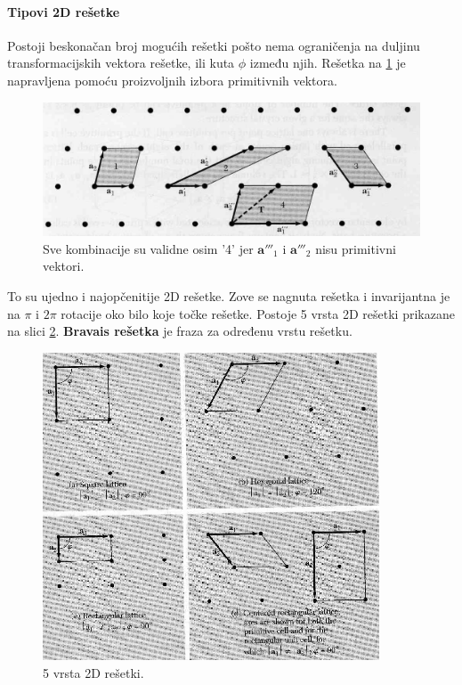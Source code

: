 \documentclass{article}
\numberwithin{equation}{section}
\begin{document}
\paragraph{Tipovi 2D rešetke}
Postoji beskonačan broj mogućih rešetki pošto nema ograničenja na duljinu transformacijskih vektora rešetke, ili kuta $\phi$ između njih. Rešetka na \ref{fig:S4} je napravljena pomoću proizvoljnih izbora primitivnih vektora. 
\newpage
\begin{figure}[h!]
    \centering
    \includegraphics[width=15cm]{Slika_3a.PNG}
    \caption{Sve kombinacije su validne osim '4' jer $\mathbf{a}'''_1$ i $\mathbf{a}'''_2$ nisu primitivni vektori.}
    \label{fig:S4}
\end{figure}
To su ujedno i najopčenitije 2D rešetke. Zove se nagnuta rešetka i invarijantna je na $\pi$ i $2\pi$ rotacije oko bilo koje točke rešetke. Postoje 5 vrsta 2D rešetki prikazane na slici \ref{fig:S5}. \textbf{Bravais rešetka} je fraza za određenu vrstu rešetku. 

\begin{figure}[h!]
    \centering
    \includegraphics[width=10cm]{Slika_4.PNG}
    \caption{5 vrsta 2D rešetki.}
    \label{fig:S5}
\end{figure}
\newpage
\end{document}
